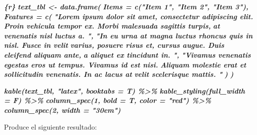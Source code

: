 \documentclass[12pt,a4paper,oneside,]{article}
\newenvironment{Shaded}{\begin{snugshade}}{\end{snugshade}}
\newcommand{\InformationTok}[1]{\textcolor[rgb]{0.56,0.35,0.01}{\textbf{\textit{#1}}}}
\numberwithin{dummy}{section}
\theoremstyle{ocrenumbox}
\theoremstyle{blacknumex}
\theoremstyle{blacknumbox}
\theoremstyle{ocrenum}
\theoremstyle{ocrenum}
\begin{document}
\begin{Shaded}
\begin{Highlighting}[]
\InformationTok{\textasciigrave{}\textasciigrave{}\textasciigrave{}\{r\}}
\InformationTok{text\_tbl \textless{}{-} data.frame(}
\InformationTok{  Items = c("Item 1", "Item 2", "Item 3"), }
\InformationTok{  Features = c(}
\InformationTok{    "Lorem ipsum dolor sit amet, consectetur adipiscing elit.}
\InformationTok{    Proin vehicula tempor ex. Morbi malesuada sagittis turpis,}
\InformationTok{    at venenatis nisl luctus a. ",}
\InformationTok{    "In eu urna at magna luctus rhoncus quis in nisl. Fusce in velit}
\InformationTok{    varius, posuere risus et, cursus augue. Duis eleifend aliquam ante,}
\InformationTok{    a aliquet ex tincidunt in. ",}
\InformationTok{    "Vivamus venenatis egestas eros ut tempus. Vivamus id est nisi.}
\InformationTok{    Aliquam molestie erat et sollicitudin venenatis. In ac lacus at}
\InformationTok{    velit scelerisque mattis. "}
\InformationTok{    ) }
\InformationTok{  )}

\InformationTok{kable(text\_tbl, "latex", booktabs = T) \%\textgreater{}\% }
\InformationTok{  kable\_styling(full\_width = F) \%\textgreater{}\% }
\InformationTok{  column\_spec(1, bold = T, color = "red") \%\textgreater{}\% }
\InformationTok{  column\_spec(2, width = "30em")}
\InformationTok{\textasciigrave{}\textasciigrave{}\textasciigrave{}}
\end{Highlighting}
\end{Shaded}

Produce el siguiente resultado:
\end{document}
